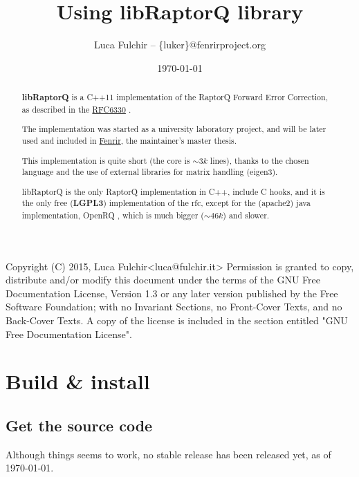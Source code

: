 \documentclass[11pt,a4paper]{refart}
\title{Using libRaptorQ library}
\author{Luca Fulchir -- \{luker\}@fenrirproject.org}
\date{\today}
\begin{document}
\maketitle

\begin{abstract}

\textbf{libRaptorQ} is a C++11 implementation of the RaptorQ Forward Error Correction, as described in the \href{https://tools.ietf.org/html/rfc6330}{RFC6330} .

The implementation was started as a university laboratory project, and will be later used and included in \href{https://www.fenrirproject.org}{Fenrir}, the
maintainer's master thesis.

This implementation is quite short (the core is $\sim3k$ lines), thanks to the chosen language and the use of external libraries for matrix handling (eigen3).

libRaptorQ is the only RaptorQ implementation in C++, include C hooks, and it is the only free (\textbf{LGPL3}) implementation of the rfc, except for the (apache2)
java implementation, OpenRQ , which is much bigger ($\sim 46k$) and slower.
\end{abstract}

\vfill\hfill
\begin{verbbox}[\tiny]
Copyright (C)  2015, Luca Fulchir<luca@fulchir.it>
Permission is granted to copy, distribute and/or modify this document
under the terms of the GNU Free Documentation License, Version 1.3
or any later version published by the Free Software Foundation;
with no Invariant Sections, no Front-Cover Texts, and no Back-Cover Texts.
A copy of the license is included in the section entitled "GNU
Free Documentation License".
\end{verbbox}
\theverbbox

\newpage
\tableofcontents
\newpage

\section{Build \& install}
\subsection{Get the source code}
Although things seems to work, no stable release has been released yet, as of \today.
\end{document}
